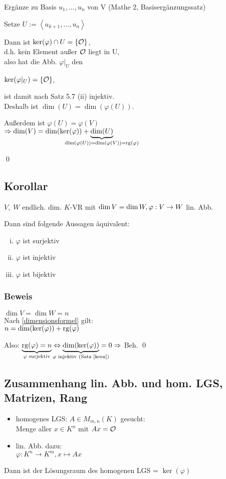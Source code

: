 Ergänze zu Basis $u_1,...,u_n$ von V (Mathe 2, Basisergänzungssatz)

Setze $U:= \left< u_{k+1},..., u_n \right>$

Dann ist $\ker(\varphi) \cap U = \{ \mathcal{O} \}$, \\d.h. kein Element außer $\mathcal{O}$ liegt in U, \\also hat die Abb. $\varphi|_U$ den 

$\ker(\varphi|_U) = \{ \mathcal{O} \}$, 

ist damit nach Satz 5.7 (ii) injektiv. \\
Deshalb ist $\dim(U) = \dim(\varphi(U))$. 

Außerdem ist $\varphi(U) = \varphi(V)$\\
$\Rightarrow \dim(V) = \dim(\ker(\varphi)) + \underbrace{\dim(U)}_{\mathclap{\dim(\varphi(U)) = \dim(\varphi(V)) = \rg(\varphi)}}$

\qed
\subsection{Korollar}
$V,\; W$ endlich. dim. $K$-VR mit $\dim V = \dim W, \; \\\varphi: V \rightarrow W$ lin. Abb. 

Dann sind folgende Aussagen äquivalent:
\begin{enumerate}[(i)]
	\item $\varphi$ ist surjektiv
	\item $\varphi$ ist injektiv
	\item $\varphi$ ist bijektiv
\end{enumerate}

\subsubsection*{Beweis}
$\dim V = \dim W = n$\\

Nach \ref{dimensionsformel} gilt:\\
$n = \dim(\ker(\varphi)) + \mathrm{ rg }(\varphi)$

Also: $\underbrace{\rg(\varphi)=n}_{\mathclap{\varphi \text{ surjektiv}}} \Leftrightarrow \underbrace{\dim(\ker(\varphi))}_{\mathclap{\varphi \text{ injektiv (Satz~\ref{kern}})}} = 0\\
\Rightarrow$ Beh.
\qed

\subsection{Zusammenhang lin. Abb. und hom. LGS, Matrizen, Rang}
\begin{itemize}
	\item homogenes LGS: $A \in M_{m,n}(K)$ gesucht: \\
	Menge aller $x \in K^n$ mit $Ax = \mathcal{O}$
	\item lin. Abb. dazu:\\
	 $\varphi: K^n \rightarrow K^m, x \mapsto Ax$
\end{itemize}
Dann ist der Lösungsraum des homogenen LGS = $\ker(\varphi)$